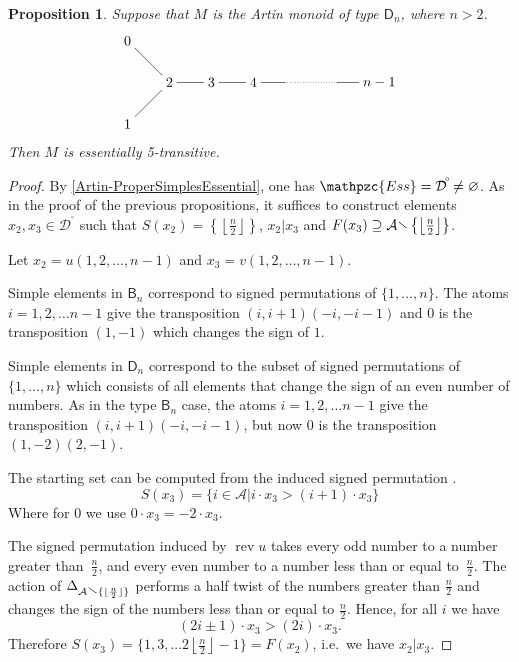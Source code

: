 \documentclass[a4paper,final]{article}
\let\emptyset\varnothing
\theoremstyle{plain}
\newtheorem{proposition}[proposition]{Proposition}
\theoremstyle{remark}
\theoremstyle{definition}
\begin{document}
\begin{proposition}
  Suppose that $M$ is the Artin monoid of type ${\mathsf{{D}}}_n$, where $n>2$.
  \[
    \begin{xy}
      0;<3em,0em>:<0em,3em>::
      
      (0,1)*+{0}="0";
      (0,-1)*+{1}="1";
      (1,0)*+{2}="2";
      (2,0)*+{3}="3";
      (3,0)*+{4}="4";
      (3.75,0)="5";
      (5,0)="6";
      (6,0)*+{n-1}="7";
      
      {\ar@{-}  "0";"2"};
      {\ar@{-}  "1";"2"};
      {\ar@{-}  "2";"3"};
      {\ar@{-}  "3";"4"};
      {\ar@{-} "4";"5"};
      {\ar@{..}  "5";"6"};
      {\ar@{-}  "6";"7"};
    \end{xy}
  \]
  Then $M$ is essentially 5-transitive.
\end{proposition}
\begin{proof}
  By \autoref{Artin-ProperSimplesEssential}, one has ${\mathpzc{Ess}}={{\mathcal{D}}^{\!{}^{\circ}\!}}\neq\emptyset$.
  As in the proof of the previous propositions, it suffices to
  construct elements $x_2, x_3 \in {{\mathcal{D}}^{\!{}^{\circ}\!}}$ such that ${S}(x_2) =
  \left\{\left\lfloor\frac{n}{2}\right\rfloor\right\}$, $x_2 | x_3$
  and ${F}(x_3) \supseteq {\mathcal{A}} {\mathbin{\raisebox{0.25ex}{$\smallsetminus$}}}
  \left\{\left\lfloor\frac{n}{2}\right\rfloor\right\}$.

  Let $x_2 = u(1,2,\ldots,n-1)$ and $x_3 = v(1,2,\ldots,n-1)$.

  Simple elements in ${\mathsf{{B}}}_n$ correspond to signed permutations
  of $\{1,\ldots,n\}$.  The atoms $i = 1, 2, \ldots n-1$ give the
  transposition $(i,i+1)(-i,-i-1)$ and $0$ is the transposition
  $(1,-1)$ which changes the sign of $1$.

  Simple elements in ${\mathsf{{D}}}_n$ correspond to the subset of signed
  permutations of $\{1,\ldots,n\}$ which consists of all elements that
  change the sign of an even number of numbers.  As in the type
  ${\mathsf{{B}}}_n$ case, the atoms $i = 1, 2, \ldots n-1$ give the
  transposition $(i,i+1)(-i,-i-1)$, but now $0$ is the transposition
  $(1,-2)(2,-1)$.

  The starting set can be computed from the induced signed
  permutation \cite[Proposition 8.2.2]{CombCox}.
  \[
    {S}(x_3) = \{ i \in {\mathcal{A}} {\boldsymbol{\mid}} i\cdot x_3 > (i+1)\cdot x_3\}
  \]
  Where for 0 we use $0\cdot x_3 = -2\cdot x_3$.

  The signed permutation induced by $\operatorname{rev} u$ takes every odd number to
  a number greater than~$\frac{n}{2}$, and every even number to a
  number less than or equal to~$\frac{n}{2}$.{}{}
  The action of
  $\Delta_{{\mathcal{A}}{\mathbin{\raisebox{0.25ex}{$\smallsetminus$}}}\{\lfloor\frac{n}{2}\rfloor\}}$ performs a
  half twist of the numbers greater than $\frac{n}{2}$ and changes the
  sign of the numbers less than or equal to $\frac{n}{2}$.  Hence, for
  all $i$ we have
  \[ (2i\pm 1)\cdot x_3 > (2i)\cdot x_3. \] 
  Therefore ${S}(x_3) = \{ 1, 3, \ldots
  2\left\lfloor\frac{n}{2}\right\rfloor - 1\} = {F}(x_2)$, i.e.\ we
  have $x_2|x_3$.
\end{proof}
\end{document}
